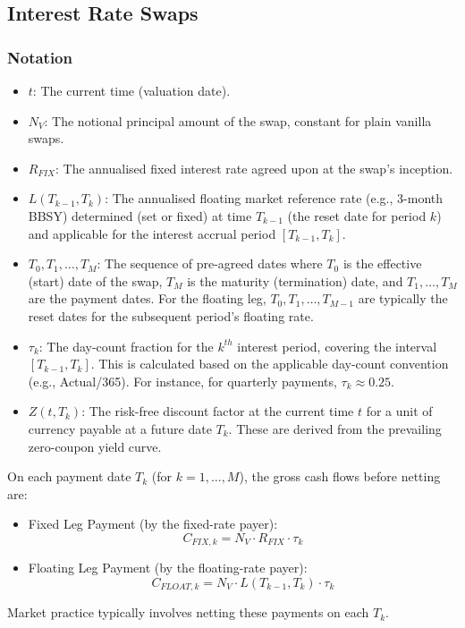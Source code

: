 \documentclass[11pt, a4paper, british]{article}
\begin{document}
\subsection{Interest Rate Swaps}

\subsubsection{Notation}
\begin{itemize}
 \item $t$: The current time (valuation date).
 \item $N_V$: The notional principal amount of the swap, constant for plain vanilla swaps.
 \item $R_{FIX}$: The annualised fixed interest rate agreed upon at the swap's inception.
 \item $L(T_{k-1}, T_k)$: The annualised floating market reference rate (e.g., 3-month BBSY) determined (set or fixed) at time $T_{k-1}$ (the reset date for period $k$) and applicable for the interest accrual period $[T_{k-1}, T_k]$.
 \item $T_0, T_1, \dots, T_M$: The sequence of pre-agreed dates where $T_0$ is the effective (start) date of the swap, $T_M$ is the maturity (termination) date, and $T_1, \dots, T_M$ are the payment dates. For the floating leg, $T_0, T_1, \dots, T_{M-1}$ are typically the reset dates for the subsequent period's floating rate.
 \item $\tau_k$: The day-count fraction for the $k^{th}$ interest period, covering the interval $[T_{k-1}, T_k]$. This is calculated based on the applicable day-count convention (e.g., Actual/365). For instance, for quarterly payments, $\tau_k \approx 0.25$.
 \item $Z(t, T_k)$: The risk-free discount factor at the current time $t$ for a unit of currency payable at a future date $T_k$. These are derived from the prevailing zero-coupon yield curve.
\end{itemize}
On each payment date $T_k$ (for $k=1, \dots, M$), the gross cash flows before netting are:
\begin{itemize}
 \item Fixed Leg Payment (by the fixed-rate payer):
 \begin{equation}
 C_{FIX,k} = N_V \cdot R_{FIX} \cdot \tau_k
 \label{eq:irs_fixed_payment_final}
 \end{equation}
 \item Floating Leg Payment (by the floating-rate payer):
 \begin{equation}
 C_{FLOAT,k} = N_V \cdot L(T_{k-1}, T_k) \cdot \tau_k
 \label{eq:irs_float_payment_final}
 \end{equation}
\end{itemize}
Market practice typically involves netting these payments on each $T_k$.
\end{document}
